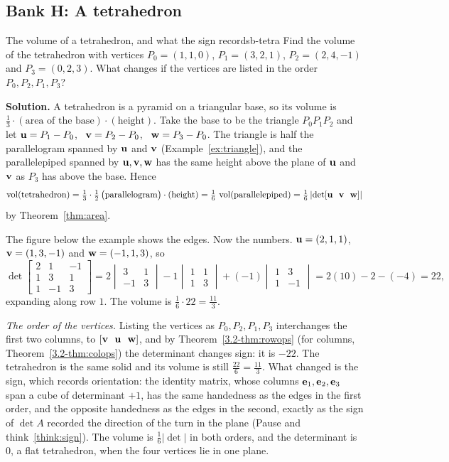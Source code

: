 \documentclass[11pt]{article}
\begin{document}
\subsection*{Bank H: A tetrahedron}

\begin{exmp}{The volume of a tetrahedron, and what the sign records}{b-tetra}
Find the volume of the tetrahedron with vertices $P_0=(1,1,0)$, $P_1=(3,2,1)$, $P_2=(2,4,-1)$ and $P_3=(0,2,3)$. What changes if the vertices are listed in the order $P_0,P_2,P_1,P_3$?

\textbf{Solution.} A tetrahedron is a pyramid on a triangular base, so its volume is $\tfrac13\cdot(\text{area of the base})\cdot(\text{height})$. Take the base to be the triangle $P_0P_1P_2$ and let $\mathbf{u}=P_1-P_0$, \ $\mathbf{v}=P_2-P_0$, \ $\mathbf{w}=P_3-P_0$. The triangle is half the parallelogram spanned by $\mathbf{u}$ and $\mathbf{v}$ (Example~\ref{ex:triangle}), and the parallelepiped spanned by $\mathbf{u},\mathbf{v},\mathbf{w}$ has the same height above the plane of $\mathbf{u}$ and $\mathbf{v}$ as $P_3$ has above the base. Hence
\[
\operatorname{vol}(\text{tetrahedron})=\tfrac13\cdot\tfrac12\,\bigl(\text{parallelogram}\bigr)\cdot(\text{height})=\tfrac16\,\operatorname{vol}(\text{parallelepiped})=\tfrac16\left|\det[\bv{u}\ \ \bv{v}\ \ \bv{w}]\right|
\]
by Theorem~\ref{thm:area}.

The figure below the example shows the edges. Now the numbers. $\mathbf{u}=(2,1,1)$, \ $\mathbf{v}=(1,3,-1)$ and $\mathbf{w}=(-1,1,3)$, so
\[
\det\begin{bmatrix}2&1&-1\\1&3&1\\1&-1&3\end{bmatrix}=2\begin{vmatrix}3&1\\-1&3\end{vmatrix}-1\begin{vmatrix}1&1\\1&3\end{vmatrix}+(-1)\begin{vmatrix}1&3\\1&-1\end{vmatrix}=2(10)-2-(-4)=22,
\]
expanding along row $1$. The volume is $\tfrac16\cdot22=\tfrac{11}3$.

\emph{The order of the vertices.} Listing the vertices as $P_0,P_2,P_1,P_3$ interchanges the first two columns, to $[\mathbf{v}\ \ \mathbf{u}\ \ \mathbf{w}]$, and by Theorem~\ref{3.2-thm:rowops} (for columns, Theorem~\ref{3.2-thm:colops}) the determinant changes sign: it is $-22$. The tetrahedron is the same solid and its volume is still $\tfrac{22}6=\tfrac{11}3$. What changed is the sign, which records orientation: the identity matrix, whose columns $\mathbf{e}_1,\mathbf{e}_2,\mathbf{e}_3$ span a cube of determinant $+1$, has the same handedness as the edges in the first order, and the opposite handedness as the edges in the second, exactly as the sign of $\det A$ recorded the direction of the turn in the plane (Pause and think~\ref{think:sign}). The volume is $\tfrac16|\det|$ in both orders, and the determinant is $0$, a flat tetrahedron, when the four vertices lie in one plane.
\end{exmp}
\end{document}
